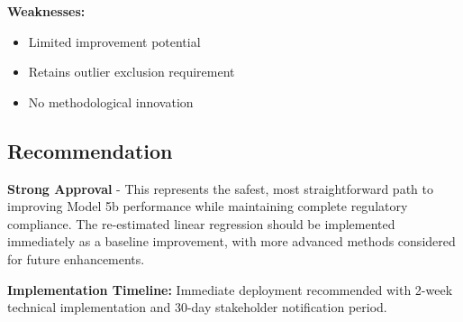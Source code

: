 \textbf{Weaknesses:}
\begin{itemize}
    \item Limited improvement potential
    \item Retains outlier exclusion requirement
    \item No methodological innovation
\end{itemize}

\subsection{Recommendation}

\textbf{Strong Approval} - This represents the safest, most straightforward path to improving Model 5b performance while maintaining complete regulatory compliance. The re-estimated linear regression should be implemented immediately as a baseline improvement, with more advanced methods considered for future enhancements.

\textbf{Implementation Timeline:} Immediate deployment recommended with 2-week technical implementation and 30-day stakeholder notification period.
